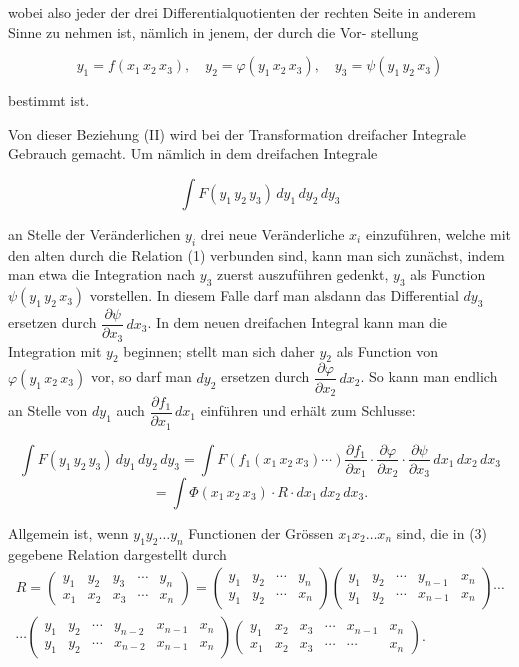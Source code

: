 \documentclass[11pt]{article}
\providecommand{\weberpage}[1]{}
\let\Phi\varPhi
\begin{document}
wobei also jeder der drei Differentialquotienten der rechten Seite in
anderem Sinne zu nehmen ist, nämlich in jenem, der durch die Vor-
stellung

\[
y_1 = f(x_1\, x_2\, x_3), \quad y_2 = \varphi(y_1\, x_2\, x_3), \quad y_3 = \psi(y_1\, y_2\, x_3)
\]

bestimmt ist.

Von dieser Beziehung (II) wird bei der Transformation dreifacher
Integrale Gebrauch gemacht. Um nämlich in dem dreifachen Integrale

\[
\int F(y_1\, y_2\, y_3)\,dy_1\,dy_2\,dy_3
\]

an Stelle der Veränderlichen $y_i$ drei neue Veränderliche $x_i$ einzuführen,
welche mit den alten durch die Relation (1) verbunden sind, kann
man sich zunächst, indem man etwa die Integration nach $y_3$ zuerst
auszuführen gedenkt, $y_3$ als Function $\psi(y_1\, y_2\, x_3)$ vorstellen. In diesem
Falle darf man alsdann das Differential $dy_3$ ersetzen durch $\dfrac{\partial \psi}{\partial x_3}\,dx_3$.
In dem neuen dreifachen Integral kann man die Integration mit $y_2$
beginnen; stellt man sich daher $y_2$ als Function von $\varphi(y_1\, x_2\, x_3)$ vor,
so darf man $dy_2$ ersetzen durch $\dfrac{\partial \varphi}{\partial x_2}\,dx_2$. So kann man endlich an
Stelle von $dy_1$ auch $\dfrac{\partial f_1}{\partial x_1}\,dx_1$ einführen und erhält zum Schlusse:

\[
\int F(y_1\, y_2\, y_3)\,dy_1\,dy_2\,dy_3 = \int F(f_1(x_1\, x_2\, x_3)\cdots)\dfrac{\partial f_1}{\partial x_1}\cdot\dfrac{\partial \varphi}{\partial x_2}\cdot\dfrac{\partial \psi}{\partial x_3}\,dx_1\,dx_2\,dx_3
\]
\[
= \int \Phi(x_1\, x_2\, x_3)\cdot R \cdot dx_1\,dx_2\,dx_3.
\]


\weberpage{127}

Allgemein ist, wenn $y_1 y_2 \ldots y_n$ Functionen der Grössen $x_1 x_2 \ldots x_n$ sind, die in (3) gegebene Relation dargestellt durch
\begin{gather*}
R = \begin{pmatrix} y_1 & y_2 & y_3 & \cdots & y_n \\ x_1 & x_2 & x_3 & \cdots & x_n \end{pmatrix}
= \begin{pmatrix} y_1 & y_2 & \cdots & y_n \\ y_1 & y_2 & \cdots & x_n \end{pmatrix}
\begin{pmatrix} y_1 & y_2 & \cdots & y_{n-1} & x_n \\ y_1 & y_2 & \cdots & x_{n-1} & x_n \end{pmatrix} \cdots \\
\cdots \begin{pmatrix} y_1 & y_2 & \cdots & y_{n-2} & x_{n-1} & x_n \\ y_1 & y_2 & \cdots & x_{n-2} & x_{n-1} & x_n \end{pmatrix}
\begin{pmatrix} y_1 & x_2 & x_3 & \cdots & x_{n-1} & x_n \\ x_1 & x_2 & x_3 & \cdots & \cdots & x_n \end{pmatrix}.
\end{gather*}
\end{document}
